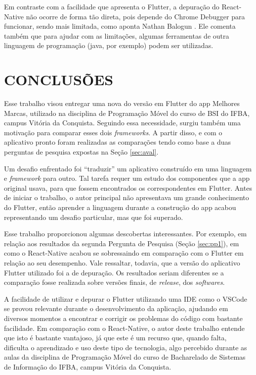 \documentclass[12pt]{article}
\begin{document}
Em contraste com a facilidade que apresenta o Flutter, a depuração do React-Native não ocorre de forma tão direta, pois depende do Chrome Debugger para funcionar, sendo mais limitada, como aponta Nathan Balogun \cite{ref_11}. Ele comenta também que para ajudar com as limitações, algumas ferramentas de outra linguagem de programação (java, por exemplo) podem ser utilizadas.

\section{CONCLUSÕES} \label{sec:conc}   

Esse trabalho visou entregar uma nova do versão em Flutter do app Melhores Marcas, utilizado na disciplina de Programação Móvel do curso de BSI do IFBA, campus Vitória da Conquista. Seguindo essa necessidade, surgiu também uma motivação para comparar esses dois \textit{frameworks}. A partir disso, e com o aplicativo pronto foram realizadas as comparações tendo como base a duas perguntas de pesquisa expostas na Seção \ref{sec:aval}.

Um desafio enfrentado foi “traduzir” um aplicativo construído em uma linguagem e \textit{framework} para outro. Tal tarefa requer um estudo dos componentes que a app original usava, para que fossem encontrados os correspondentes em Flutter. Antes de iniciar o trabalho, o autor principal não apresentava um grande conhecimento do Flutter, então aprender a linguagem durante a construção do app acabou representando um desafio particular, mas que foi superado. 

Esse trabalho proporcionou algumas descobertas interessantes. Por exemplo, em relação aos resultados da segunda Pergunta de Pesquisa (Seção \ref{sec:pp1}), em como o React-Native acabou se sobressaindo em comparação com o Flutter em relação ao seu desempenho. Vale ressaltar, todavia, que a versão do aplicativo Flutter utilizado foi a de depuração. Os resultados seriam diferentes se a comparação fosse realizada sobre versões finais, de \textit{release}, dos \textit{softwares}.

A facilidade de utilizar e depurar o Flutter utilizando uma IDE como o VSCode se provou relevante durante o desenvolvimento da aplicação, ajudando em diversos momentos a encontrar e corrigir os problemas do código com bastante facilidade. Em comparação com o React-Native, o autor deste trabalho entende que isto é bastante vantajoso, já que este é um recurso que, quando falta, dificulta o aprendizado e uso deste tipo de tecnologia, algo percebido durante as aulas da disciplina de Programação Móvel do curso de Bacharelado de Sistemas de Informação do IFBA, campus Vitória da Conquista.
\end{document}
